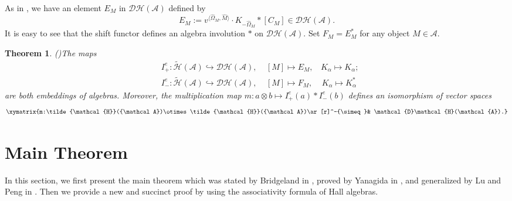\documentclass[reqno,12pt]{amsart}
\numberwithin{equation}{section}
\def\Ext{\mbox{\rm Ext}\,} \def\Hom{\mbox{\rm Hom}} \def\dim{\mbox{\rm dim}\,} \def\Iso{\mbox{\rm Iso}\,}
\def\lr#1{\langle #1\rangle} \def\fin{\hfill$\square$}  \def\lra{\longrightarrow} \def\Tor{\mbox{\rm Tor}\,}
\def\A{{\mathcal A}}\def\P{{\mathscr{P}}}
\theoremstyle{plain} %
\newtheorem{theorem}{\bf Theorem}[section]
\newtheorem{lemma}[theorem]{\bf Lemma}
\newtheorem{proposition}[theorem]{\bf Proposition}
\theoremstyle{definition} %
\begin{document}
As in \cite{Br}, we have an element $E_M$ in $\mathcal {D}\mathcal {H}(\mathcal{A})$ defined by
$$E_M :=v^{\lr{\hat{\Omega}_M,\hat{M}}}\cdot K_{-\hat{\Omega}_M} \ast [C_M] \in \mathcal {D}\mathcal {H}(\mathcal{A}).$$
It is easy to see that the shift functor defines an algebra involution $\ast$ on $\mathcal {D}\mathcal {H}(\mathcal{A})$. Set $F_M = E_M^\ast$ for any object $M \in \mathcal{A}$.



\begin{theorem}{\rm(\cite[Lemmas 4.6,4.7]{Br})}\label{embedding0}
The maps
\begin{equation*}
\begin{split}&I_{+}^e:\tilde{\mathcal {H}}(\A)\hookrightarrow \mathcal {D}\mathcal {H}(\mathcal{A}), ~~~~~[M]\mapsto E_M,~~~~K_{\alpha}\mapsto K_{\alpha};\\
&I_{-}^e:\tilde{\mathcal {H}}(\A)\hookrightarrow \mathcal {D}\mathcal {H}(\mathcal{A}), ~~~~~[M]\mapsto F_M,~~~~~K_{\alpha}\mapsto K_{\alpha}^\ast
\end{split}
\end{equation*}
are both embeddings of algebras. Moreover, the multiplication map
$m:a\otimes b\mapsto I_+^e(a)\ast I_-^e(b)$ defines an isomorphism of vector spaces
$$\xymatrix{m:\tilde{\mathcal {H}}(\A)\otimes\tilde{\mathcal {H}}(\A)\ar[r]^-{\simeq}& \mathcal {D}\mathcal {H}(\mathcal{A}).}$$
\end{theorem}

\section{Main Theorem}
In this section, we first present the main theorem which was stated by Bridgeland in \cite{Br}, proved by Yanagida in \cite{Yan}, and generalized by Lu and Peng in \cite{LP}. Then we provide a new and succinct proof by using the associativity formula of Hall algebras.
\end{document}
